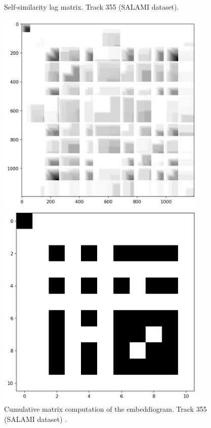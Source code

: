 \begin{figure}[ht]
\begin{minipage}{0.45\textwidth}
        \caption[Self-similarity lag matrix | Track 355 (SALAMI dataset)]{Self-similarity lag matrix. Track 355 (SALAMI dataset).}
        \label{fig:SSLM}
    \end{minipage}
    \vfill
    \begin{minipage}{0.45\textwidth}
        \centering
        \includegraphics[width=0.9\textwidth]{figures/images/355cumulativematrix.png} %
        \caption[Q-matrix | Track 355 (SALAMI dataset)]{Cumulative matrix computation of the embeddiogram. Track 355 (SALAMI dataset) .}
        \label{fig:Q}
    \end{minipage}\hfill
    \begin{minipage}{0.45\textwidth}
        \centering
        \includegraphics[width=0.9\textwidth]{figures/images/355transitivebinarysimilaritymatrix.png} %

\end{minipage}
\end{figure}
